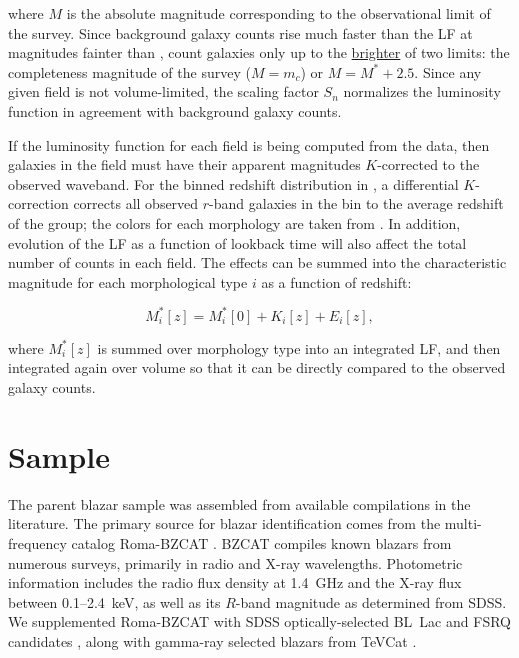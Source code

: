 \documentclass{emulateapj}
\begin{document}
\noindent where $M$ is the absolute magnitude corresponding to the observational limit of the survey. Since background galaxy counts rise much faster than the LF at magnitudes fainter than \mstar, \citet{yee87} count galaxies only up to the \underline{brighter} of two limits: the completeness magnitude of the survey ($M=m_c$) or $M=M^* + 2.5$. Since any given field is not volume-limited, the scaling factor $S_n$ normalizes the luminosity function in agreement with background galaxy counts. 

If the luminosity function for each field is being computed from the data, then galaxies in the field must have their apparent magnitudes $K$-corrected to the observed waveband. For the binned redshift distribution in \citet{yee87}, a differential $K$-correction corrects all observed $r$-band galaxies in the bin to the average redshift of the group; the colors for each morphology are taken from \citet{seb86}. In addition, evolution of the LF as a function of lookback time will also affect the total number of counts in each field. The effects can be summed into the characteristic magnitude for each morphological type $i$ as a function of redshift:

\begin{equation}
\label{eqn-mstar_morph}
M_i^*[z] = M_i^*[0] + K_i[z] + E_i[z],
\end{equation}

\noindent where $M_i^*[z]$ is summed over morphology type into an integrated LF, and then integrated again over volume so that it can be directly compared to the observed galaxy counts. 


\section{Sample}\label{sec-sample}

The parent blazar sample was assembled from available compilations in the literature. The primary source for blazar identification comes from the multi-frequency catalog Roma-BZCAT \citep{mas09}. BZCAT compiles known blazars from numerous surveys, primarily in radio and X-ray wavelengths. Photometric information includes the radio flux density at 1.4~GHz and the X-ray flux between 0.1--2.4~keV, as well as its $R$-band magnitude as determined from SDSS. We supplemented Roma-BZCAT with SDSS optically-selected BL~Lac \citep{plo10} and FSRQ candidates \citep{che09a}, along with gamma-ray selected blazars from TeVCat \citep{hor08}. 
\end{document}
